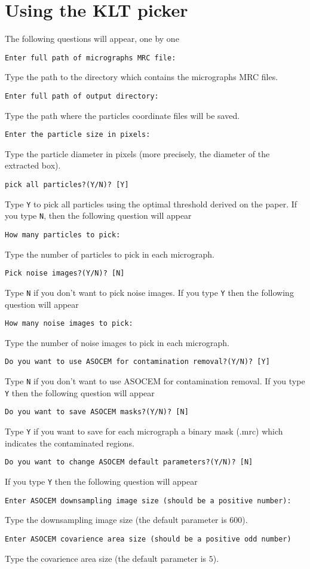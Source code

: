 \documentclass[12pt,a4paper]{article}
\begin{document}
\section{Using the KLT picker}\label{sec:usage}
The following questions will appear, one by one
\begin{flushleft}
\texttt{Enter full path of micrographs MRC file: }
\end{flushleft}
Type the path to the directory which contains the micrographs MRC files.
\begin{flushleft}
	\texttt{Enter full path of output directory:}
\end{flushleft}
Type the path where the particles coordinate files will be saved.
\begin{flushleft}
	\texttt{Enter the particle size in pixels:}
\end{flushleft}
Type the particle diameter in pixels (more precisely, the diameter of the extracted box).
\begin{flushleft}
	\texttt{pick all particles?(Y/N)? [Y] }
\end{flushleft}
 Type \texttt{Y} to pick all particles using the optimal threshold derived on the paper. If you type \texttt{N}, then the following question will appear
 \begin{flushleft}
 	\texttt{How many particles to pick: }
 \end{flushleft}
Type the number of particles to pick in each micrograph.
\begin{flushleft}
	\texttt{Pick noise images?(Y/N)? [N]}
\end{flushleft}
Type \texttt{N} if you don't want to pick noise images. If you type \texttt{Y} then the following question will appear
\begin{flushleft}
	\texttt{How many noise images to pick:}
\end{flushleft}
Type the number of noise images to pick in each micrograph.
\begin{flushleft}
	\texttt{Do you want to use ASOCEM for contamination removal?(Y/N)? [Y]}
\end{flushleft}
Type \texttt{N} if you don't want to use ASOCEM for contamination removal. If you type \texttt{Y} then the following question will appear
\begin{flushleft}
	\texttt{Do you want to save ASOCEM masks?(Y/N)? [N] }
\end{flushleft}
Type \texttt{Y} if you want to save for each micrograph a binary mask (.mrc) which indicates the contaminated regions.
\begin{flushleft}
	\texttt{Do you want to change ASOCEM default parameters?(Y/N)? [N] }
\end{flushleft}
If you type \texttt{Y} then the following question will appear
\begin{flushleft}
	\texttt{Enter ASOCEM downsampling image size (should be a positive number):}
\end{flushleft}
Type the downsampling  image size (the default parameter is $ 600$).
\begin{flushleft}
	\texttt{Enter ASOCEM covarience area size (should be a positive odd number)}
\end{flushleft}
Type the covarience area size (the default parameter is $ 5$).
\end{document}
